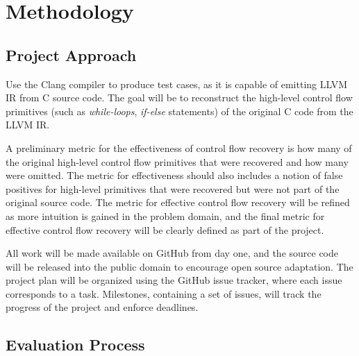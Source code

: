 \documentclass[12pt, a4paper]{article}
\begin{document}
\clearpage


\section{Methodology}


\subsection{Project Approach}

Use the Clang compiler to produce test cases, as it is capable of emitting LLVM IR from C source code. The goal will be to reconstruct the high-level control flow primitives (such as \textit{while-loops}, \textit{if-else} statements) of the original C code from the LLVM IR.

A preliminary metric for the effectiveness of control flow recovery is how many of the original high-level control flow primitives that were recovered and how many were omitted. The metric for effectiveness should also includes a notion of false positives for high-level primitives that were recovered but were not part of the original source code. The metric for effective control flow recovery will be refined as more intuition is gained in the problem domain, and the final metric for effective control flow recovery will be clearly defined as part of the project.

All work will be made available on GitHub from day one, and the source code will be released into the public domain to encourage open source adaptation. The project plan will be organized using the GitHub issue tracker, where each issue corresponds to a task. Milestones, containing a set of issues, will track the progress of the project and enforce deadlines.


\subsection{Evaluation Process}

\end{document}
